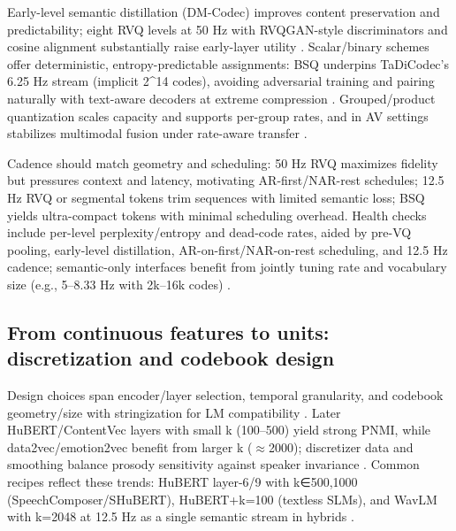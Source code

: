 \documentclass{article}
\begin{document}
Early-level semantic distillation (DM-Codec) improves content preservation and predictability; eight RVQ levels at 50 Hz with RVQGAN-style discriminators and cosine alignment substantially raise early-layer utility \cite{ahasan2025dmcodecdistillingmultimodalrepresentatio}. Scalar/binary schemes offer deterministic, entropy-predictable assignments: BSQ underpins TaDiCodec's 6.25 Hz stream (implicit 2^{14} codes), avoiding adversarial training and pairing naturally with text-aware decoders at extreme compression \cite{wang2025tadicodectextawarediffusionspeechtokeniz}. Grouped/product quantization scales capacity and supports per-group rates, and in AV settings stabilizes multimodal fusion under rate-aware transfer \cite{sadok2025vectorquantizedmaskedautoencoderaudiovis}.

Cadence should match geometry and scheduling: 50 Hz RVQ maximizes fidelity but pressures context and latency, motivating AR-first/NAR-rest schedules; 12.5 Hz RVQ or segmental tokens trim sequences with limited semantic loss; BSQ yields ultra-compact tokens with minimal scheduling overhead. Health checks include per-level perplexity/entropy and dead-code rates, aided by pre-VQ pooling, early-level distillation, AR-on-first/NAR-on-rest scheduling, and 12.5 Hz cadence; semantic-only interfaces benefit from jointly tuning rate and vocabulary size (e.g., 5--8.33 Hz with 2k--16k codes) \cite{peng2024mslms2stmultitaskspeechlanguagemodeltext,zeng2024scalingspeechtextpretrainingsyntheticint,yang2025diffsoundstreamefficientspeechtokenizati,wang2025tadicodectextawarediffusionspeechtokeniz,ahasan2025dmcodecdistillingmultimodalrepresentatio,baade2024syllablelmlearningcoarsesemanticunitsspe}.

\subsection{From continuous features to units: discretization and codebook design} \label{subsec:fromcontinuousfeaturestounits:discretizationandcodebookdesign}
Design choices span encoder/layer selection, temporal granularity, and codebook geometry/size with stringization for LM compatibility \cite{guo2025recentadvancesdiscretespeechtokensreview}. Later HuBERT/ContentVec layers with small k (100--500) yield strong PNMI, while data2vec/emotion2vec benefit from larger k ($\approx$2000); discretizer data and smoothing balance prosody sensitivity against speaker invariance \cite{onda2025benchmarkingprosodyencodingdiscretespeec}. Common recipes reflect these trends: HuBERT layer-6/9 with k∈{500,1000} (SpeechComposer/SHuBERT), HuBERT+k=100 (textless SLMs), and WavLM with k=2048 at 12.5 Hz as a single semantic stream in hybrids \cite{wu2024speechcomposerunifyingmultiplespeechtask,hsu2024exploringcontextlearningtextlessspeechla,yang2025diffsoundstreamefficientspeechtokenizati}.
\end{document}

